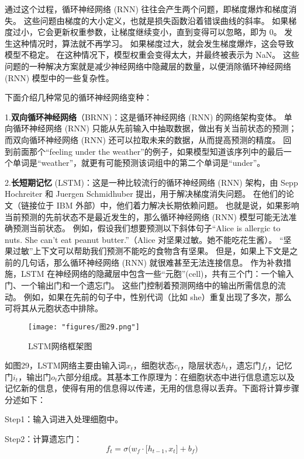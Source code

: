 通过这个过程，循环神经网络 (RNN) 往往会产生两个问题，即梯度爆炸和梯度消失。 这些问题由梯度的大小定义，也就是损失函数沿着错误曲线的斜率。 如果梯度过小，它会更新权重参数，让梯度继续变小，直到变得可以忽略，即为 0。 发生这种情况时，算法就不再学习。 如果梯度过大，就会发生梯度爆炸，这会导致模型不稳定。 在这种情况下，模型权重会变得太大，并最终被表示为 NaN。 这些问题的一种解决方案就是减少神经网络中隐藏层的数量，以便消除循环神经网络 (RNN) 模型中的一些复杂性。

下面介绍几种常见的循环神经网络变种：

1.\textbf{双向循环神经网络}（BRNN)：这是循环神经网络 (RNN) 的网络架构变体。 单向循环神经网络 (RNN) 只能从先前输入中抽取数据，做出有关当前状态的预测；而双向循环神经网络 (RNN) 还可以拉取未来的数据，从而提高预测的精度。 回到前面那个“feeling under the weather”的例子，如果模型知道该序列中的最后一个单词是“weather”，就更有可能预测该词组中的第二个单词是“under”。

2.\textbf{长短期记忆} (LSTM)：这是一种比较流行的循环神经网络 (RNN) 架构，由 Sepp Hochreiter 和 Juergen Schmidhuber 提出，用于解决梯度消失问题。 在他们的论文（链接位于 IBM 外部）中，他们着力解决长期依赖问题。 也就是说，如果影响当前预测的先前状态不是最近发生的，那么循环神经网络 (RNN) 模型可能无法准确预测当前状态。 例如，假设我们想要预测以下斜体句子“Alice is allergic to nuts. She can't eat peanut butter.”（Alice 对坚果过敏。她不能吃花生酱）。 “坚果过敏”上下文可以帮助我们预测不能吃的食物含有坚果。 但是，如果上下文是之前的几句话，那么循环神经网络 (RNN) 就很难甚至无法连接信息。 作为补救措施，LSTM 在神经网络的隐藏层中包含一些“元胞”(cell)，共有三个门：一个输入门、一个输出门和一个遗忘门。 这些门控制着预测网络中的输出所需信息的流动。  例如，如果在先前的句子中，性别代词（比如 she）重复出现了多次，那么可将其从元胞状态中排除。
\begin{figure}[ht] %
	\centering
	\texttt{[image: "figures/图29.png"]} %
	\caption{LSTM网络框架图} %
	\label{fig:example} %
\end{figure}

如图29，LSTM网络主要由输入词$x_{t}$，细胞状态$c_{t}$，隐层状态$h_{t}$，遗忘门$f_{t}$，记忆门$i_{t}$，输出门$o_{t}$六部分组成。其基本工作原理为：在细胞状态中进行信息遗忘以及记忆新的信息，使得有用的信息得以传递，无用的信息得以丢弃。下面将计算步骤分述如下：

Step1：输入词进入处理细胞中。

Step2：计算遗忘门：
\begin{equation}f_t=\sigma\big(w_f\cdot\big[h_{t-1},x_t\big]+b_f\big)\end{equation}

